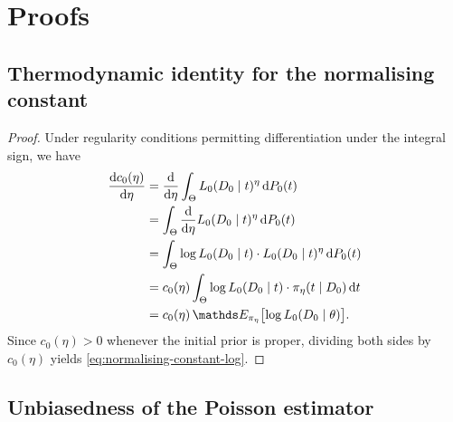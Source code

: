 \chapter{Proofs}

\section{Thermodynamic identity for the normalising constant}
\label{proof:deriv-normalising-constant}

\begin{proof}
Under regularity conditions permitting differentiation under the integral sign, we have
\begin{align}
    \dv{c_0(\eta)}{\eta}
    &= \dv{}{\eta} \int_{\Theta} L_0(D_0 \mid t)^{\eta}\, \dd P_0(t) \\
    &= \int_{\Theta} \dv{}{\eta} L_0(D_0 \mid t)^{\eta}\, \dd P_0(t) \\
    &= \int_{\Theta} \log L_0(D_0 \mid t)\cdot L_0(D_0 \mid t)^{\eta}\, \dd P_0(t) \\
    &= c_0(\eta) \int_{\Theta} \log L_0(D_0 \mid t)\cdot \pi_\eta(t \mid D_0)\, \dd t \\
    &= c_0(\eta)\, \bE_{\pi_\eta}\bigl[\log L_0(D_0 \mid \theta)\bigr].
\end{align}
Since $c_0(\eta) > 0$ whenever the initial prior is proper, dividing both sides by $c_0(\eta)$ yields \eqref{eq:normalising-constant-log}.
\end{proof}

\section{Unbiasedness of the Poisson estimator}
\label{proof:poisson-unbiased}


